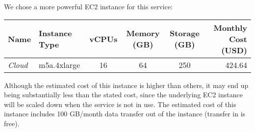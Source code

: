 We chose a more powerful EC2 instance for this service:

\begin{center}
\begin{tabular}{ |l|l|c|c|c|r| } 
 \hline
 Name & Instance Type & vCPUs & Memory (GB) & Storage (GB) & Monthly Cost (USD) \\ [0.5ex]
 \hline
 \textit{Cloud} & m5a.4xlarge & 16 & 64 & 250 & 424.64 \\ 
 \hline
\end{tabular}
\end{center}

\noindent
Although the estimated cost of this instance is higher than others, it may end up being substantially less than the stated cost, since the underlying EC2 instance will be scaled down when the service is not in use.
The estimated cost of this instance includes 100 GB/month data transfer out of the instance (transfer in is free).





